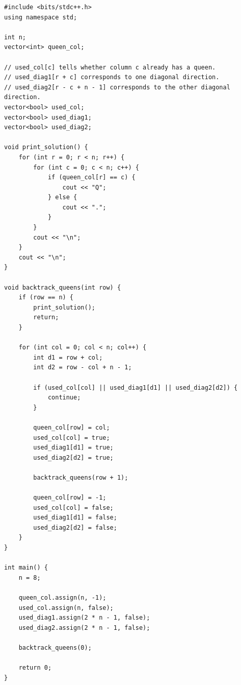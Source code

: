 \documentclass[11pt]{article}
\begin{document}
\begin{lstlisting}
#include <bits/stdc++.h>
using namespace std;

int n;
vector<int> queen_col;

// used_col[c] tells whether column c already has a queen.
// used_diag1[r + c] corresponds to one diagonal direction.
// used_diag2[r - c + n - 1] corresponds to the other diagonal direction.
vector<bool> used_col;
vector<bool> used_diag1;
vector<bool> used_diag2;

void print_solution() {
    for (int r = 0; r < n; r++) {
        for (int c = 0; c < n; c++) {
            if (queen_col[r] == c) {
                cout << "Q";
            } else {
                cout << ".";
            }
        }
        cout << "\n";
    }
    cout << "\n";
}

void backtrack_queens(int row) {
    if (row == n) {
        print_solution();
        return;
    }

    for (int col = 0; col < n; col++) {
        int d1 = row + col;
        int d2 = row - col + n - 1;

        if (used_col[col] || used_diag1[d1] || used_diag2[d2]) {
            continue;
        }

        queen_col[row] = col;
        used_col[col] = true;
        used_diag1[d1] = true;
        used_diag2[d2] = true;

        backtrack_queens(row + 1);

        queen_col[row] = -1;
        used_col[col] = false;
        used_diag1[d1] = false;
        used_diag2[d2] = false;
    }
}

int main() {
    n = 8;

    queen_col.assign(n, -1);
    used_col.assign(n, false);
    used_diag1.assign(2 * n - 1, false);
    used_diag2.assign(2 * n - 1, false);

    backtrack_queens(0);

    return 0;
}
\end{lstlisting}
\end{document}

